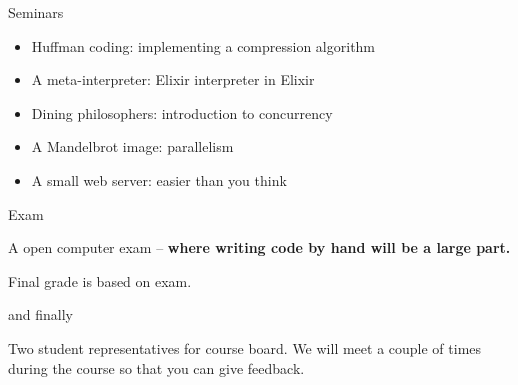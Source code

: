 \begin{frame}{Seminars}
  \begin{itemize}
    \item Huffman coding: implementing a compression algorithm \pause
    \item A meta-interpreter: Elixir interpreter in Elixir \pause
    \item Dining philosophers: introduction to concurrency \pause
    \item A Mandelbrot image: parallelism \pause
    \item A small web server: easier than you think
  \end{itemize}
\end{frame}

\begin{frame}{Exam}

\pause A open computer exam -- {\bf where writing code by hand will be a large part.}

\vspace{20pt}

\pause Final grade is based on exam. 

\end{frame}

\begin{frame}{and finally}

  Two student representatives for course board. We will meet a couple
  of times during the course so that you can give feedback.

\end{frame}


